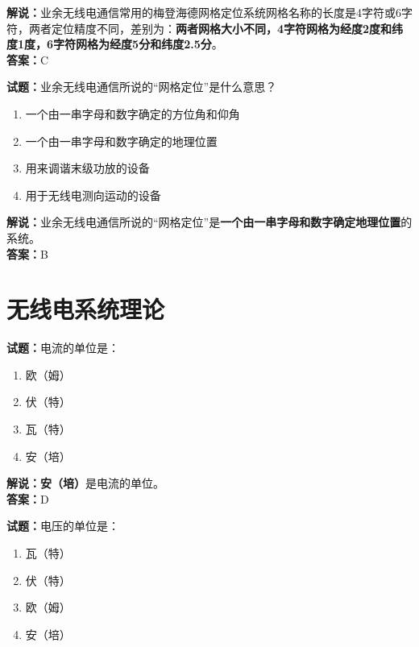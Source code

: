 \documentclass{ctexbook}
\begin{document}
\noindent\textbf{解说：}业余无线电通信常用的梅登海德网格定位系统网格名称的长度是4字符或6字符，两者定位精度不同，差别为：\textbf{两者网格大小不同，4字符网格为经度2度和纬度1度，6字符网格为经度5分和纬度2.5分}。\\\noindent\textbf{答案：}C

\bigskip

\noindent\textbf{试题：}业余无线电通信所说的“网格定位”是什么意思？

\begin{enumerate}[leftmargin=3em]
  \item 一个由一串字母和数字确定的方位角和仰角
  \item 一个由一串字母和数字确定的地理位置 %
  \item 用来调谐末级功放的设备
  \item 用于无线电测向运动的设备
\end{enumerate}

\noindent\textbf{解说：}业余无线电通信所说的“网格定位”是\textbf{一个由一串字母和数字确定地理位置}的系统。\\\noindent\textbf{答案：}B



\chapter{无线电系统理论}

\newpage

\noindent\textbf{试题：}电流的单位是：

\begin{enumerate}[leftmargin=3em]
  \item 欧（姆）
  \item 伏（特）
  \item 瓦（特）
  \item 安（培）
\end{enumerate}

\noindent\textbf{解说：}\textbf{安（培）}是电流的单位。\cite[137-138]{si}\\
\noindent\textbf{答案：}D

\bigskip

\noindent\textbf{试题：}电压的单位是：

\begin{enumerate}[leftmargin=3em]
  \item 瓦（特）
  \item 伏（特）
  \item 欧（姆）
  \item 安（培）
\end{enumerate}
\end{document}
